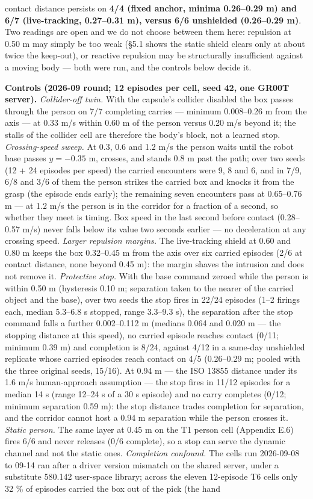 \documentclass{article}
\begin{document}
contact distance persists on \textbf{4/4 (fixed anchor, minima 0.26--0.29 m) and 6/7 (live-tracking, 0.27--0.31 m), versus 6/6 unshielded (0.26--0.29 m)}. Two readings are open and we do not choose between them here: repulsion at 0.50 m may simply be too weak (\S5.1 shows the static shield clears only at about twice the keep-out), or reactive repulsion may be structurally insufficient against a moving body --- both were run, and the controls below decide it.

\textbf{Controls (2026-09 round; 12 episodes per cell, seed 42, one GR00T server).} \emph{Collider-off twin.} With the capsule's collider disabled the box passes through the person on 7/7 completing carries --- minimum 0.008--0.26 m from the axis --- at 0.33 m/s within 0.60 m of the person versus 0.20 m/s beyond it; the stalls of the collider cell are therefore the body's block, not a learned stop. \emph{Crossing-speed sweep.} At 0.3, 0.6 and 1.2 m/s the person waits until the robot base passes $y = -0.35$ m, crosses, and stands 0.8 m past the path; over two seeds (12 + 24 episodes per speed) the carried encounters were 9, 8 and 6, and in 7/9, 6/8 and 3/6 of them the person strikes the carried box and knocks it from the grasp (the episode ends early); the remaining seven encounters pass at 0.65--0.76 m --- at 1.2 m/s the person is in the corridor for a fraction of a second, so whether they meet is timing. Box speed in the last second before contact (0.28--0.57 m/s) never falls below its value two seconds earlier --- no deceleration at any crossing speed. \emph{Larger repulsion margins.} The live-tracking shield at 0.60 and 0.80 m keeps the box 0.32--0.45 m from the axis over six carried episodes (2/6 at contact distance, none beyond 0.45 m): the margin shaves the intrusion and does not remove it. \emph{Protective stop.} With the base command zeroed while the person is within 0.50 m (hysteresis 0.10 m; separation taken to the nearer of the carried object and the base), over two seeds the stop fires in 22/24 episodes (1--2 firings each, median 5.3--6.8 s stopped, range 3.3--9.3 s), the separation after the stop command falls a further 0.002--0.112 m (medians 0.064 and 0.020 m --- the stopping distance at this speed), no carried episode reaches contact (0/11; minimum 0.39 m) and completion is 8/24, against 4/12 in a same-day unshielded replicate whose carried episodes reach contact on 4/5 (0.26--0.29 m; pooled with the three original seeds, 15/16). At 0.94 m --- the ISO 13855 distance under its 1.6 m/s human-approach assumption --- the stop fires in 11/12 episodes for a median 14 s (range 12--24 s of a 30 s episode) and no carry completes (0/12; minimum separation 0.59 m): the stop distance trades completion for separation, and the corridor cannot host a 0.94 m separation while the person crosses it. \emph{Static person.} The same layer at 0.45 m on the T1 person cell (Appendix E.6) fires 6/6 and never releases (0/6 complete), so a stop can serve the dynamic channel and not the static ones. \emph{Completion confound.} The cells run 2026-09-08 to 09-14 ran after a driver version mismatch on the shared server, under a substitute 580.142 user-space library; across the eleven 12-episode T6 cells only 32 \% of episodes carried the box out of the pick (the hand 
\end{document}
